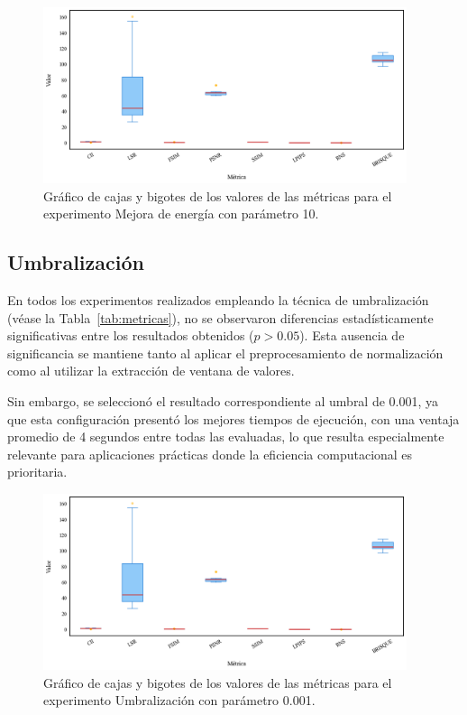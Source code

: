 \begin{figure}[H]
    \centering
    \includegraphics[width=0.95\textwidth]{Graphics/boxplot-enhancement.png}
    \caption{Gráfico de cajas y bigotes de los valores de las métricas para el experimento Mejora de energía con parámetro 10.}
    \label{fig:boxplot-enhancement}
\end{figure}

\subsection{Umbralización}

En todos los experimentos realizados empleando la técnica de umbralización (véase la Tabla~\ref{tab:metricas}), no se observaron diferencias estadísticamente significativas entre los resultados obtenidos ($p > 0.05$). Esta ausencia de significancia se mantiene tanto al aplicar el preprocesamiento de normalización como al utilizar la extracción de ventana de valores.

Sin embargo, se seleccionó el resultado correspondiente al umbral de 0.001, ya que esta configuración presentó los mejores tiempos de ejecución, con una ventaja promedio de 4 segundos entre todas las evaluadas, lo que resulta especialmente relevante para aplicaciones prácticas donde la eficiencia computacional es prioritaria.

\begin{figure}[H]
    \centering
    \includegraphics[width=0.95\textwidth]{Graphics/boxplot-threshold.png}
    \caption{Gráfico de cajas y bigotes de los valores de las métricas para el experimento Umbralización con parámetro 0.001.}
    \label{fig:boxplot-threshold}
\end{figure}

